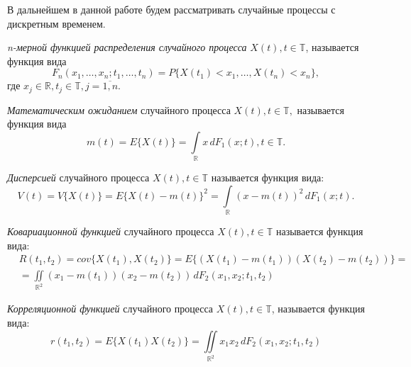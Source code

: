 В дальнейшем в данной работе будем рассматривать случайные процессы с дискретным временем.

\begin{Definition}
\label{def:distr_func}
	\textit{n-мерной функцией распределения случайного процесса} $ X(t), t \in \mathbb{T} $, называется функция вида
	\begin{equation*}
		F_n(x_1, \dots, x_n; t_1, \dots, t_n) = P \{ X(t_1) < x_1, \dots, X(t_n) < x_n \},
	\end{equation*}
	где $ x_j \in \mathbb{R}, t_j \in \mathbb{T}, j = \overline{1,n} $.
\end{Definition}

\begin{Definition}
	\textit{Математическим ожиданием} случайного процесса $ X(t), t \in \mathbb{T}, $ называется функция вида
	\begin{equation*}
		m(t) = E \{ X(t) \} = \int \limits_{\mathbb{R}} x \, dF_1(x;t), t \in \mathbb{T}.
	\end{equation*}
\end{Definition}

\begin{Definition}
	\textit{Дисперсией} случайного процесса $ X(t), t \in \mathbb{T} $ называется функция вида:
	\begin{equation*}
		V(t) = {V \{ X(t) \} = E \{ X(t) - m(t) \}}^2 = \int \limits_{\mathbb{R}} {(x - m(t))}^2 \, dF_1(x; t).
	\end{equation*}
\end{Definition}

\begin{Definition}
	\textit{Ковариационной функцией} случайного процесса $ X(t), t \in \mathbb{T} $ называется функция вида:
	\begin{eqnarray*}
		& R(t_1, t_2) = cov\{ X(t_1), X(t_2) \} = E \{ (X(t_1) - m(t_1)) (X(t_2) - m(t_2)) \} = \\
		& = \iint \limits_{\mathbb{R}^2} (x_1 - m(t_1)) (x_2 - m(t_2)) \, dF_2(x_1, x_2; t_1, t_2)
	\end{eqnarray*}
\end{Definition}

\begin{Definition}
	\textit{Корреляционной функцией} случайного процесса $ X(t), t \in \mathbb{T} $, называется функция вида:
	\begin{equation*}
		r(t_1, t_2) = E \{ X(t_1)X(t_2) \} = \iint \limits_{\mathbb{R}^2} x_1 x_2 \, dF_2(x_1, x_2; t_1, t_2)
	\end{equation*}
\end{Definition}

